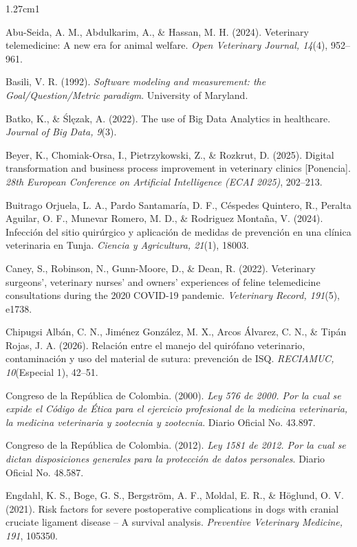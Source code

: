 \documentclass[stu, spanish]{apa7}
\begin{document}
\begin{hangparas}{1.27cm}{1}

Abu-Seida, A. M., Abdulkarim, A., \& Hassan, M. H. (2024). Veterinary telemedicine: A new era for animal welfare. \textit{Open Veterinary Journal, 14}(4), 952--961.

Basili, V. R. (1992). \textit{Software modeling and measurement: the Goal/Question/Metric paradigm}. University of Maryland.

Batko, K., \& \'{S}l\k{e}zak, A. (2022). The use of Big Data Analytics in healthcare. \textit{Journal of Big Data, 9}(3).

Beyer, K., Chomiak-Orsa, I., Pietrzykowski, Z., \& Rozkrut, D. (2025). Digital transformation and business process improvement in veterinary clinics [Ponencia]. \textit{28th European Conference on Artificial Intelligence (ECAI 2025)}, 202--213.

Buitrago Orjuela, L. A., Pardo Santamar\'{i}a, D. F., C\'{e}spedes Quintero, R., Peralta Aguilar, O. F., Munevar Romero, M. D., \& Rodriguez Monta\~{n}a, V. (2024). Infecci\'{o}n del sitio quir\'{u}rgico y aplicaci\'{o}n de medidas de prevenci\'{o}n en una cl\'{i}nica veterinaria en Tunja. \textit{Ciencia y Agricultura, 21}(1), 18003.

Caney, S., Robinson, N., Gunn-Moore, D., \& Dean, R. (2022). Veterinary surgeons', veterinary nurses' and owners' experiences of feline telemedicine consultations during the 2020 COVID-19 pandemic. \textit{Veterinary Record, 191}(5), e1738.

Chipugsi Alb\'{a}n, C. N., Jim\'{e}nez Gonz\'{a}lez, M. X., Arcos \'{A}lvarez, C. N., \& Tip\'{a}n Rojas, J. A. (2026). Relaci\'{o}n entre el manejo del quir\'{o}fano veterinario, contaminaci\'{o}n y uso del material de sutura: prevenci\'{o}n de ISQ. \textit{RECIAMUC, 10}(Especial 1), 42--51.

Congreso de la Rep\'{u}blica de Colombia. (2000). \textit{Ley 576 de 2000. Por la cual se expide el C\'{o}digo de \'{E}tica para el ejercicio profesional de la medicina veterinaria, la medicina veterinaria y zootecnia y zootecnia}. Diario Oficial No. 43.897.

Congreso de la Rep\'{u}blica de Colombia. (2012). \textit{Ley 1581 de 2012. Por la cual se dictan disposiciones generales para la protecci\'{o}n de datos personales}. Diario Oficial No. 48.587.

Engdahl, K. S., Boge, G. S., Bergstr\"{o}m, A. F., Moldal, E. R., \& H\"{o}glund, O. V. (2021). Risk factors for severe postoperative complications in dogs with cranial cruciate ligament disease -- A survival analysis. \textit{Preventive Veterinary Medicine, 191}, 105350.


\end{hangparas}
\end{document}
